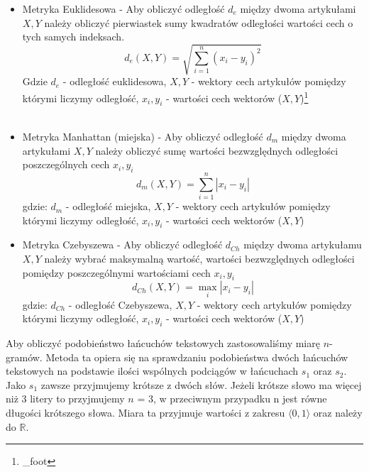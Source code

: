 \documentclass{classrep}
\begin{document}
\begin{itemize}
  \item Metryka Euklidesowa - Aby obliczyć odległość $d_e$ między dwoma artykułami $X, Y$ należy obliczyć pierwiastek sumy kwadratów odległości wartości cech o tych samych indeksach.
    \begin{equation}\label{euklides}
        d_e(X,Y) = \sqrt{\sum_{i=1}^{n}(x_i - y_i)^2}
    \end{equation}
    Gdzie $d_e$ - odległość euklidesowa, $X, Y$ - wektory cech artykułów pomiędzy którymi liczymy odległość, $x_i, y_i$ - wartości cech wektorów ($X, Y$)\footnote{\engram_foot}\\\
    
  \item Metryka Manhattan (miejska) - Aby obliczyć odległość $d_m$ między dwoma artykułami $X, Y$ należy obliczyć sumę wartości bezwzględnych odległości poszczególnych cech $x_i, y_i$
    \begin{equation}\label{manhattan}
        d_{m}(X,Y) = \sum_{i=1}^{n} | x_i - y_i |
    \end{equation}
    gdzie: $d_m$ - odległość miejska, $X, Y$ - wektory cech artykułów pomiędzy którymi liczymy odległość, $x_i, y_i$ - wartości cech wektorów ($X, Y$)\footnotemark[\value{footnote}]\\
    
  \item Metryka Czebyszewa - Aby obliczyć odległość $d_{Ch}$ między dwoma artykułamu $X, Y$ należy wybrać maksymalną wartość, wartości bezwzględnych odległości pomiędzy poszczególnymi wartościami cech $x_i, y_i$
    \begin{equation}\label{czebyszew}
        d_{Ch}(X,Y)= \max_{i}{|x_i - y_i|}
    \end{equation}
    gdzie: $d_{Ch}$ - odległość Czebyszewa, $X, Y$ - wektory cech artykułów pomiędzy którymi liczymy odległość, $x_i, y_i$ - wartości cech wektorów ($X, Y$)\footnotemark[\value{footnote}]\\
\end{itemize}

Aby obliczyć podobieństwo łańcuchów tekstowych zastosowaliśmy miarę $n$-gramów. Metoda ta opiera się na sprawdzaniu podobieństwa dwóch łańcuchów tekstowych na podstawie ilości wspólnych podciągów w łańcuchach $s_1$ oraz $s_2$. Jako $s_1$ zawsze przyjmujemy krótsze z dwóch słów. Jeżeli krótsze słowo ma więcej niż 3 litery to przyjmujemy $n$ = 3, w przeciwnym przypadku n jest równe długości krótszego słowa. Miara ta przyjmuje wartości z zakresu $\langle 0, 1\rangle$ oraz należy do $\mathbb{R}$.
\end{document}

